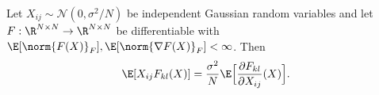 \begin{lemma}\label{lem:stein}
Let $X_{ij} \sim \mathcal{N}(0, \sigma^2/N)$ be independent Gaussian random variables and let $F : \R^{N \times N} \to \R^{N \times N}$ be differentiable with $\E[\norm{F(X)}_F], \E[\norm{\nabla F(X)}_F] < \infty$. Then
\begin{equation}
\E[X_{ij} F_{kl}(X)] = \frac{\sigma^2}{N} \E\Bigl[\frac{\partial F_{kl}}{\partial X_{ij}}(X)\Bigr].
\end{equation}
\end{lemma}
